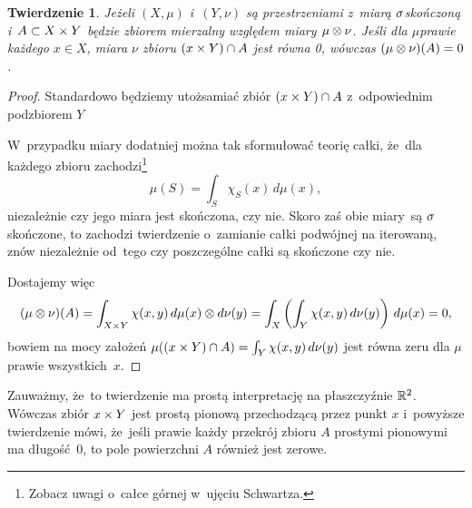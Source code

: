 \documentclass[a4paper,11pt]{article}
\newtheorem{twr}{Twierdzenie} %
\begin{document}
\begin{twr}
  \label{twr:miaraA}
  Jeżeli $( X, \mu )$ i~$( Y, \nu )$ są przestrzeniami z~miarą
  $\sigma$\dywiz skończoną i~$A \subset X \times Y$ będzie zbiorem mierzalny
  względem miary $\mu \otimes \nu$. Jeśli dla $\mu$\dywiz prawie każdego
  $x \in X$, miara $\nu$ zbioru $( x \times Y ) \cap A$ jest równa 0,
  wówczas $(\mu \otimes \nu)( A ) = 0$.
\end{twr}
\begin{proof}
  Standardowo będziemy utożsamiać zbiór $( x \times Y ) \cap A$
  z~odpowiednim podzbiorem $Y$

  W~przypadku miary dodatniej można tak sformułować teorię całki,
  że~dla każdego zbioru zachodzi\footnote{Zobacz uwagi o~całce górnej
    w~ujęciu Schwartza.}
  \begin{equation*}
    \mu( S ) = \int_{ S } \chi_{ S }( x ) \, d\mu( x ),
  \end{equation*}
  niezależnie czy jego miara jest skończona, czy nie. Skoro zaś obie
  miary~są $\sigma$\dywiz skończone, to zachodzi twierdzenie o~zamianie
  całki podwójnej na iterowaną, znów niezależnie od~tego czy
  poszczególne całki są skończone czy nie.

  Dostajemy więc
  \begin{equation*}
    (\mu \otimes \nu)( A ) = \int_{ X \times Y } \chi( x, y )
    \, d\mu( x ) \otimes d\nu( y )
    = \int_{ X } \left( \int_{ Y } \chi( x, y ) \, d\nu( y ) \right)
    \, d\mu( x ) = 0,
  \end{equation*}
  bowiem na mocy założeń
  $\mu( ( x \times Y ) \cap A ) = \int_{ Y } \chi( x, y ) \, d\nu( y )$
  jest równa zeru dla $\mu$\dywiz prawie wszystkich~$x$.
\end{proof}
Zauważmy, że~to twierdzenie ma prostą interpretację na płaszczyźnie
$\mathbb{R}^{ 2 }$. Wówczas zbiór $x \times Y$ jest prostą pionową przechodzącą
przez punkt $x$ i~powyższe twierdzenie mówi, że~jeśli prawie każdy
przekrój zbioru $A$ prostymi pionowymi ma długość~0, to pole
powierzchni $A$ również jest zerowe.

\vspace{\spaceFour}
\end{document}
